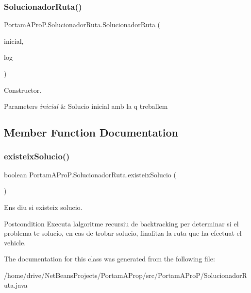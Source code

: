 \subsubsection{\texorpdfstring{Solucionador\+Ruta()}{SolucionadorRuta()}}
{\footnotesize\ttfamily Portam\+A\+Pro\+P.\+Solucionador\+Ruta.\+Solucionador\+Ruta (\begin{DoxyParamCaption}\item[{\hyperlink{class_portam_a_pro_p_1_1_solucio_ruta}{Solucio\+Ruta}}]{inicial,  }\item[{String\+Builder}]{log }\end{DoxyParamCaption})}



Constructor. 


\begin{DoxyParams}{Parameters}
{\em inicial} & Solucio inicial amb la q treballem \\
\hline
\end{DoxyParams}


\subsection{Member Function Documentation}
\mbox{\label{class_portam_a_pro_p_1_1_solucionador_ruta_a74732a1383914a52049ee518d1f16460}} 
\subsubsection{\texorpdfstring{existeix\+Solucio()}{existeixSolucio()}}
{\footnotesize\ttfamily boolean Portam\+A\+Pro\+P.\+Solucionador\+Ruta.\+existeix\+Solucio (\begin{DoxyParamCaption}{ }\end{DoxyParamCaption})}



Ens diu si existeix solucio. 

\begin{DoxyPostcond}{Postcondition}
Executa l\textquotesingle{}algoritme recursiu de backtracking per determinar si el problema te solucio, en cas de trobar solucio, finalitza la ruta que ha efectuat el vehicle. 
\end{DoxyPostcond}


The documentation for this class was generated from the following file\+:\begin{DoxyCompactItemize}
\item 
/home/drive/\+Net\+Beans\+Projects/\+Portam\+A\+Prop/src/\+Portam\+A\+Pro\+P/Solucionador\+Ruta.\+java\end{DoxyCompactItemize}
